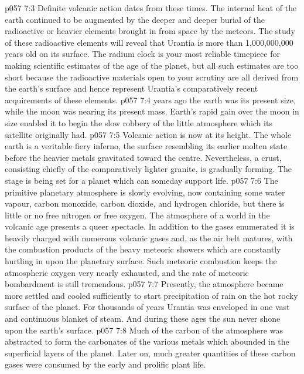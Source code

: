 \vs p057 7:3 Definite volcanic action dates from these times. The internal heat of the earth continued to be augmented by the deeper and deeper burial of the radioactive or heavier elements brought in from space by the meteors. The study of these radioactive elements will reveal that Urantia is more than 1,000,000,000 years old on its surface. The radium clock is your most reliable timepiece for making scientific estimates of the age of the planet, but all such estimates are too short because the radioactive materials open to your scrutiny are all derived from the earth’s surface and hence represent Urantia’s comparatively recent acquirements of these elements.
\vs p057 7:4 \pc {} years ago the earth was  its present size, while the moon was nearing its present mass. Earth’s rapid gain over the moon in size enabled it to begin the slow robbery of the little atmosphere which its satellite originally had.
\vs p057 7:5 Volcanic action is now at its height. The whole earth is a veritable fiery inferno, the surface resembling its earlier molten state before the heavier metals gravitated toward the centre.  Nevertheless, a crust, consisting chiefly of the comparatively lighter granite, is gradually forming. The stage is being set for a planet which can someday support life.
\vs p057 7:6 \pc The primitive planetary atmosphere is slowly evolving, now containing some water vapour, carbon monoxide, carbon dioxide, and hydrogen chloride, but there is little or no free nitrogen or free oxygen. The atmosphere of a world in the volcanic age presents a queer spectacle. In addition to the gases enumerated it is heavily charged with numerous volcanic gases and, as the air belt matures, with the combustion products of the heavy meteoric showers which are constantly hurtling in upon the planetary surface. Such meteoric combustion keeps the atmospheric oxygen very nearly exhausted, and the rate of meteoric bombardment is still tremendous.
\vs p057 7:7 \pc Presently, the atmosphere became more settled and cooled sufficiently to start precipitation of rain on the hot rocky surface of the planet. For thousands of years Urantia was enveloped in one vast and continuous blanket of steam. And during these ages the sun never shone upon the earth’s surface.
\vs p057 7:8 Much of the carbon of the atmosphere was abstracted to form the carbonates of the various metals which abounded in the superficial layers of the planet. Later on, much greater quantities of these carbon gases were consumed by the early and prolific plant life.

